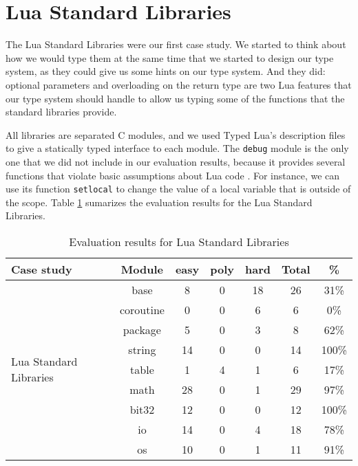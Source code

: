 \section{Lua Standard Libraries}

The Lua Standard Libraries \citep{luamanual} were our first case study.
We started to think about how we would type them at the same time that
we started to design our type system, as they could give us some hints
on our type system.
And they did: optional parameters and overloading on the return type
are two Lua features that our type system should handle to allow us
typing some of the functions that the standard libraries provide.

All libraries are separated C modules, and we used Typed Lua's description
files to give a statically typed interface to each module.
The \texttt{debug} module is the only one that we did not include in our
evaluation results, because it provides several functions that violate
basic assumptions about Lua code \citep{luamanual}.
For instance, we can use its function \texttt{setlocal} to change the value
of a local variable that is outside of the scope.
Table \ref{tab:evallsl} sumarizes the evaluation results for the Lua Standard Libraries.

\begin{table}[!ht]
\begin{center}
\begin{tabular}{|l|c|c|c|c|c|c|}
\hline
\textbf{Case study} & \textbf{Module} & \textbf{easy} & \textbf{poly} & \textbf{hard} & \textbf{Total} & \textbf{\%} \\
\hline
\multirow{9}{*}{Lua Standard Libraries}
& base & 8 & 0 & 18 & 26 & 31\% \\
\cline{2-7}
& coroutine & 0 & 0 & 6 & 6 & 0\% \\
\cline{2-7}
& package & 5 & 0 & 3 & 8 & 62\% \\
\cline{2-7}
& string & 14 & 0 & 0 & 14 & 100\% \\
\cline{2-7}
& table & 1 & 4 & 1 & 6 & 17\% \\
\cline{2-7}
& math & 28 & 0 & 1 & 29 & 97\% \\
\cline{2-7}
& bit32 & 12 & 0 & 0 & 12 & 100\% \\
\cline{2-7}
& io & 14 & 0 & 4 & 18 & 78\% \\
\cline{2-7}
& os & 10 & 0 & 1 & 11 & 91\% \\
\hline
\end{tabular}
\end{center}
\caption{Evaluation results for Lua Standard Libraries}
\label{tab:evallsl}
\end{table}

